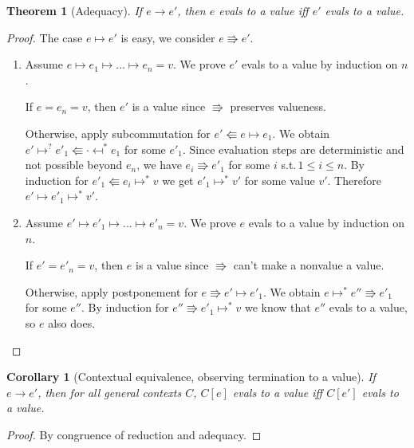 \documentclass[a4paper, 11pt,titlepage, openright, twoside]{report}
\newcommand{\+}{\enspace}
\newtheorem{corollary}{Corollary}
\newtheorem{theorem}{Theorem}
\begin{document}
\begin{theorem}[Adequacy]
	If $e → e'$, then $e$ evals to a value iff $e'$ evals to a value.
\end{theorem}
\begin{proof}

%
	The case $e ↦ e'$ is easy, we consider $e \Rrightarrow e'$.

	\begin{enumerate}
		\item
			Assume $e ↦ e_1 ↦ ... ↦ e_n = v$.
			We prove $e'$ evals to a value by induction on $n$.

			If $e=e_n=v$, then $e'$ is a value since $\Rrightarrow$ preserves valueness.

			Otherwise, apply subcommutation for $e' \Lleftarrow e ↦ e_1$.
			We obtain $e' ↦^? e'_1 \Lleftarrow · \mapsfrom^* e_1$ for some $e'_1$.
			Since evaluation steps are deterministic and not possible beyond $e_n$,
			we have $e_i \Rrightarrow e'_1$ for some $i$ s.t.\,$1 ≤ i ≤ n$.
			By induction for $e'_1 \Lleftarrow e_i ↦^* v$ we get $e'_1 ↦^* v'$ for some value $v'$.
			Therefore $e' ↦ e'_1 ↦^* v'$.

		\item
			Assume $e' ↦ e'_1 ↦ ... ↦ e'_n = v$.
			We prove $e$ evals to a value by induction on $n$.

			If $e'=e'_n=v$, then $e$ is a value since $\Rrightarrow$ can't make a nonvalue a value.

			Otherwise, apply postponement for $e \Rrightarrow e' ↦ e'_1$.
			We obtain $e ↦^* e'' \Rrightarrow e'_1$ for some $e''$.
			By induction for $e'' \Rrightarrow e'_1 ↦^* v$ we know that $e''$ evals to a value,
			so $e$ also does.

	\end{enumerate}
\end{proof}


\begin{corollary}[Contextual equivalence, observing termination to a value]
	\label{ctxeqv1}
	If $e → e'$, then for all general contexts $C$, $C[e]$ evals to a value iff $C[e']$ evals to a value.%
\end{corollary}
\begin{proof}
	By congruence of reduction and adequacy.
\end{proof}
\end{document}
